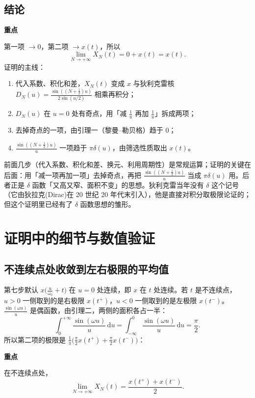 \documentclass[UTF8,a4paper,11pt]{ctexart}
\newenvironment{remember}{\begin{rememberbox}\textbf{重点}\par\smallskip}{\end{rememberbox}}
\newcounter{ex}[section]
\begin{document}
\subsection{结论}
\begin{remember}
第一项 $\to0$，第二项 $\to x(t)$，所以
\[
\lim_{N\to+\infty}X_N(t)=0+x(t)=x(t).
\]
证明的主线：
\begin{enumerate}[nosep]
\item 代入系数、积化和差，$X_N(t)$ 变成 $x$ 与狄利克雷核 $D_N(u)=\frac{\sin((N+\frac12)u)}{2\sin(u/2)}$ 相乘再积分；
\item $D_N(u)$ 在 $u=0$ 处有奇点，用「减 $\frac1u$ 再加 $\frac1u$」拆成两项；
\item 去掉奇点的一项，由引理一（黎曼--勒贝格）趋于 $0$；
\item $\frac{\sin((N+\frac12)u)}{u}$ 一项趋于 $\pi\delta(u)$，由筛选性质取出 $x(t)$。
\end{enumerate}
\end{remember}

前面几步（代入系数、积化和差、换元、利用周期性）是常规运算；证明的关键在后面：用「减一项再加一项」去掉奇点，再把 $\frac{\sin((N+\frac12)u)}{u}$ 当成 $\pi\delta(u)$ 用。后者正是 $\delta$ 函数「又高又窄、面积不变」的思想。狄利克雷当年没有 $\delta$ 这个记号（它由狄拉克(Dirac)在 20 世纪 20 年代末引入），他是直接对积分取极限论证的；但这个证明里已经有了 $\delta$ 函数思想的雏形。

\section{证明中的细节与数值验证}\label{sec:detail}

\subsection{不连续点处收敛到左右极限的平均值}\label{sub:jump}
第七步默认 $x\big(\frac{u}{\omega_0}+t\big)$ 在 $u=0$ 处连续，即 $x$ 在 $t$ 处连续。若 $t$ 是不连续点，$u>0$ 一侧取到的是右极限 $x(t^+)$，$u<0$ 一侧取到的是左极限 $x(t^-)$。$\frac{\sin(\omega u)}{u}$ 是偶函数，由引理二，两侧的面积各占一半：
\[
\int_0^{+\infty}\frac{\sin(\omega u)}{u}\,\mathrm{d}u=\int_{-\infty}^{0}\frac{\sin(\omega u)}{u}\,\mathrm{d}u=\frac{\pi}{2}.
\]
所以第二项的极限是 $\frac1\pi\big(\frac\pi2x(t^+)+\frac\pi2x(t^-)\big)$：
\begin{remember}
在不连续点处，
\[
\lim_{N\to+\infty}X_N(t)=\frac{x(t^+)+x(t^-)}{2}.
\]
\end{remember}
\end{document}
